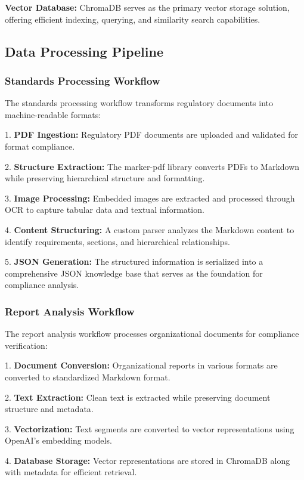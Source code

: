 \documentclass[conference]{IEEEtran}
\begin{document}
\textbf{Vector Database:} ChromaDB serves as the primary vector storage solution, offering efficient indexing, querying, and similarity search capabilities.

\subsection{Data Processing Pipeline}

\subsubsection{Standards Processing Workflow}
The standards processing workflow transforms regulatory documents into machine-readable formats:

1. \textbf{PDF Ingestion:} Regulatory PDF documents are uploaded and validated for format compliance.

2. \textbf{Structure Extraction:} The marker-pdf library converts PDFs to Markdown while preserving hierarchical structure and formatting.

3. \textbf{Image Processing:} Embedded images are extracted and processed through OCR to capture tabular data and textual information.

4. \textbf{Content Structuring:} A custom parser analyzes the Markdown content to identify requirements, sections, and hierarchical relationships.

5. \textbf{JSON Generation:} The structured information is serialized into a comprehensive JSON knowledge base that serves as the foundation for compliance analysis.

\subsubsection{Report Analysis Workflow}
The report analysis workflow processes organizational documents for compliance verification:

1. \textbf{Document Conversion:} Organizational reports in various formats are converted to standardized Markdown format.

2. \textbf{Text Extraction:} Clean text is extracted while preserving document structure and metadata.

3. \textbf{Vectorization:} Text segments are converted to vector representations using OpenAI's embedding models.

4. \textbf{Database Storage:} Vector representations are stored in ChromaDB along with metadata for efficient retrieval.
\end{document}
